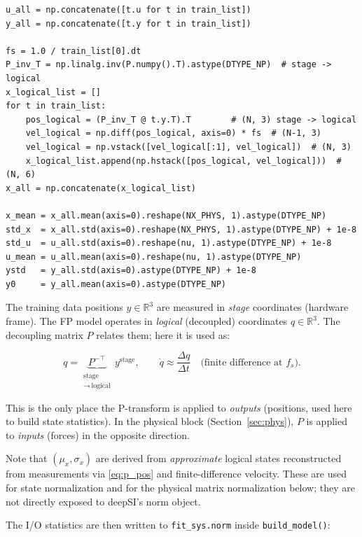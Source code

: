 \documentclass[11pt,a4paper]{article}
\newcommand{\code}[1]{\texttt{#1}}
\newcommand{\codetitle}[2]{\small\texttt{#1}\quad lines #2}
\begin{document}
\begin{lstlisting}[style=py,
  title={\codetitle{gantry\_interconnect\_dynamic.py}{166--184}},
  firstnumber=166]
u_all = np.concatenate([t.u for t in train_list])
y_all = np.concatenate([t.y for t in train_list])

fs = 1.0 / train_list[0].dt
P_inv_T = np.linalg.inv(P.numpy().T).astype(DTYPE_NP)  # stage -> logical
x_logical_list = []
for t in train_list:
    pos_logical = (P_inv_T @ t.y.T).T        # (N, 3) stage -> logical
    vel_logical = np.diff(pos_logical, axis=0) * fs  # (N-1, 3)
    vel_logical = np.vstack([vel_logical[:1], vel_logical])  # (N, 3)
    x_logical_list.append(np.hstack([pos_logical, vel_logical]))  # (N, 6)
x_all = np.concatenate(x_logical_list)

x_mean = x_all.mean(axis=0).reshape(NX_PHYS, 1).astype(DTYPE_NP)
std_x  = x_all.std(axis=0).reshape(NX_PHYS, 1).astype(DTYPE_NP) + 1e-8
std_u  = u_all.std(axis=0).reshape(nu, 1).astype(DTYPE_NP) + 1e-8
u_mean = u_all.mean(axis=0).reshape(nu, 1).astype(DTYPE_NP)
ystd   = y_all.std(axis=0).astype(DTYPE_NP) + 1e-8
y0     = y_all.mean(axis=0).astype(DTYPE_NP)
\end{lstlisting}

The training data positions $y \in \mathbb{R}^3$ are measured in
\emph{stage} coordinates (hardware frame).
The FP model operates in \emph{logical} (decoupled) coordinates $q \in \mathbb{R}^3$.
The decoupling matrix $P$ relates them; here it is used as:

\begin{equation}
  q = \underbrace{P^{-\top}}_{\substack{\text{stage} \\ \to\,\text{logical}}}\, y^{\mathrm{stage}},
  \qquad
  \dot{q} \approx \frac{\Delta q}{\Delta t}\quad\text{(finite difference at } f_s\text{)}.
  \label{eq:p_pos}
\end{equation}

This is the only place the P-transform is applied to \emph{outputs}
(positions, used here to build state statistics).
In the physical block (Section~\ref{sec:phys}), $P$ is applied to
\emph{inputs} (forces) in the opposite direction.

Note that $(\mu_x, \sigma_x)$ are derived from
\emph{approximate} logical states reconstructed from measurements via
\eqref{eq:p_pos} and finite-difference velocity.
These are used for state normalization and for the physical matrix
normalization below; they are not directly exposed to deepSI's norm object.

The I/O statistics are then written to \code{fit\_sys.norm} inside
\code{build\_model()}:
\end{document}
